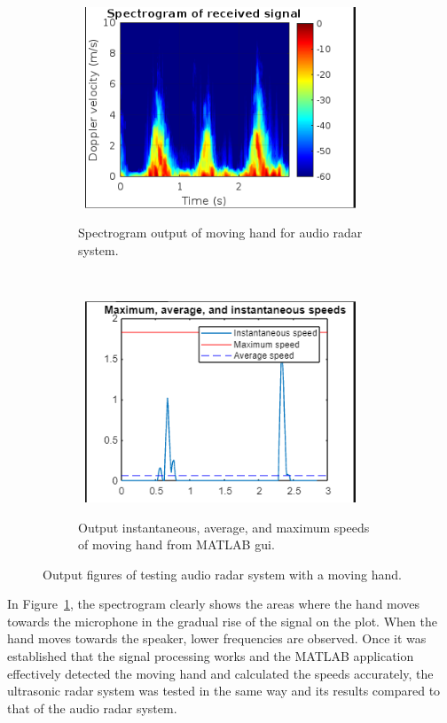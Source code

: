 \documentclass[class=report,11pt,crop=false]{standalone}
\begin{document}
\begin{figure}[htbp]
    \centering
    \captionsetup{type=figure}
    \begin{subfigure}[t]{0.5\textwidth}
        \centering
        \def\svgwidth{1\linewidth}
        {\scriptsize
            \includegraphics[width=8.5cm,height=6cm]{../Images/specTest.png}}
        \caption{Spectrogram output of moving hand for audio radar system.}
        \label{fig:audio-spectrogram}
    \end{subfigure}%
    ~ 
    \begin{subfigure}[t]{0.5\textwidth}
        \def\svgwidth{1\linewidth}
        {\scriptsize
            \includegraphics[width=8.5cm,height=6cm]{../Images/speedsPlot.png}}
        \caption{Output instantaneous, average, and maximum speeds of moving hand from \textsc{MATLAB} \gls{gui}.}
        \label{fig:audio-speeds}
    \end{subfigure}
    \caption{Output figures of testing audio \gls{radar} system with a moving hand.}
    \label{fig:audio-output}
\end{figure}

In Figure~\ref{fig:audio-spectrogram}, the spectrogram clearly shows the areas where the hand moves towards the microphone in the gradual rise of the signal on the plot. When the hand moves towards the speaker, lower frequencies are observed. Once it was established that the signal processing works and the \textsc{MATLAB} application effectively detected the moving hand and calculated the speeds accurately, the ultrasonic \gls{radar} system was tested in the same way and its results compared to that of the audio radar system.
\ifstandalone

\printnoidxglossary[type=\acronymtype,nonumberlist]
\fi
\end{document}
